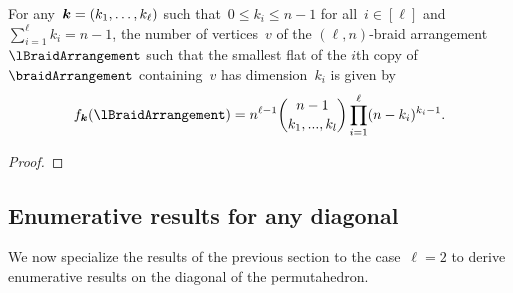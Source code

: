 \begin{theorem}
\label{thm:verticesRefinedlnBraidArrangement}
For any~$\boldsymbol{k}  = (k_1, \dots, k_\ell)$ such that~$0 \le k_i \le n-1$ for all~$i \in [\ell]$ and~$\sum_{i=1}^\ell k_i = n-1$, the number of vertices~$v$ of the $(\ell,n)$-braid arrangement~$\lBraidArrangement$ such that the smallest flat of the $i$th copy of~$\braidArrangement$ containing~$v$ has dimension~$k_i$ is given by
\[
f_{\b{k}}(\lBraidArrangement) = n^{\ell-1}  \binom{n-1}{k_1, ..., k_l} \prod_{i=1}^\ell (n-k_i)^{k_i-1}.
\]
\end{theorem}

\begin{proof}
\end{proof}

\subsection{Enumerative results for any diagonal} 
\label{s:facets}

We now specialize the results of the previous section to the case~$\ell = 2$ to derive enumerative results on the diagonal of the permutahedron.

